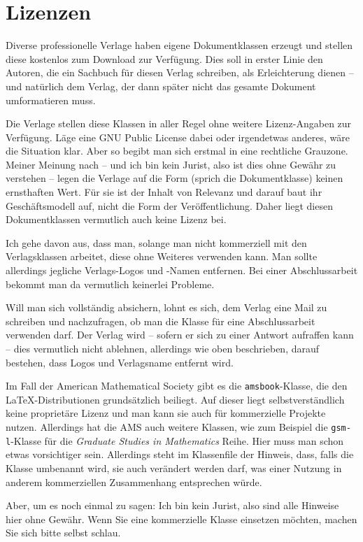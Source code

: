 \section{Lizenzen}

Diverse professionelle Verlage haben eigene Dokumentklassen erzeugt und stellen diese kostenlos zum Download zur Verfügung. Dies soll in erster Linie den Autoren, die ein Sachbuch für diesen Verlag schreiben, als Erleichterung dienen -- und natürlich dem Verlag, der dann später nicht das gesamte Dokument umformatieren muss. 

Die Verlage stellen diese Klassen in aller Regel ohne weitere Lizenz-Angaben zur Verfügung. Läge eine GNU Public License dabei oder irgendetwas anderes, wäre die Situation klar. Aber so begibt man sich erstmal in eine rechtliche Grauzone. Meiner Meinung nach -- und ich bin kein Jurist, also ist dies ohne Gewähr zu verstehen -- legen die Verlage auf die Form (sprich die Dokumentklasse) keinen ernsthaften Wert. Für sie ist der Inhalt von Relevanz und darauf baut ihr Geschäftsmodell auf, nicht die Form der Veröffentlichung. Daher liegt diesen Dokumentklassen vermutlich auch keine Lizenz bei. 

Ich gehe davon aus, dass man, solange man nicht kommerziell mit den Verlagsklassen arbeitet, diese ohne Weiteres verwenden kann. Man sollte allerdings jegliche Verlags-Logos und -Namen entfernen. Bei einer Abschlussarbeit bekommt man da vermutlich keinerlei Probleme.

Will man sich vollständig absichern, lohnt es sich, dem Verlag eine Mail zu schreiben und nachzufragen, ob man die Klasse für eine Abschlussarbeit verwenden darf. Der Verlag wird -- sofern er sich zu einer Antwort aufraffen kann -- dies vermutlich nicht ablehnen, allerdings wie oben beschrieben, darauf bestehen, dass Logos und Verlagsname entfernt wird. 

Im Fall der American Mathematical Society gibt es die \texttt{amsbook}-Klasse, die den \LaTeX-Distributionen grundsätzlich beiliegt. Auf dieser liegt selbstverständlich keine proprietäre Lizenz und man kann sie auch für kommerzielle Projekte nutzen. Allerdings hat die AMS auch weitere Klassen, wie zum Beispiel die \texttt{gsm-l}-Klasse für die \textsl{Graduate Studies in Mathematics} Reihe. Hier muss man schon etwas vorsichtiger sein. Allerdings steht im Klassenfile der Hinweis, dass, falls die Klasse umbenannt wird, sie auch verändert werden darf, was einer Nutzung in anderem kommerziellen Zusammenhang entsprechen würde. 

Aber, um es noch einmal zu sagen: Ich bin kein Jurist, also sind alle Hinweise hier ohne Gewähr. Wenn Sie eine kommerzielle Klasse einsetzen möchten, machen Sie sich bitte selbst schlau. 



